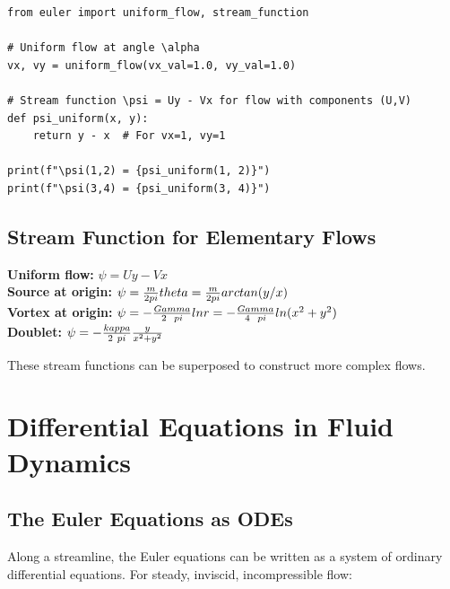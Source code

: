 \begin{lstlisting}[caption={Stream function for uniform flow}, label=lst:stream_uniform]
from euler import uniform_flow, stream_function

# Uniform flow at angle \alpha
vx, vy = uniform_flow(vx_val=1.0, vy_val=1.0)

# Stream function \psi = Uy - Vx for flow with components (U,V)
def psi_uniform(x, y):
    return y - x  # For vx=1, vy=1

print(f"\psi(1,2) = {psi_uniform(1, 2)}")
print(f"\psi(3,4) = {psi_uniform(3, 4)}")
\end{lstlisting}

\subsection{Stream Function for Elementary Flows}

\textbf{Uniform flow:} $\psi = Uy - Vx$\\
\textbf{Source at origin:} $\psi = \frac{m}{2\\pi}\\theta = \frac{m}{2\\pi}\\arctan(y/x)$\\
\textbf{Vortex at origin:} $\psi = -\frac{\\Gamma}{2\\pi}\\ln r = -\frac{\\Gamma}{4\\pi}\\ln(x^2+y^2)$\\
\textbf{Doublet:} $\psi = -\frac{\\kappa}{2\\pi}\frac{y}{x^2+y^2}$

These stream functions can be superposed to construct more complex flows.

\section{Differential Equations in Fluid Dynamics}

\subsection{The Euler Equations as ODEs}

Along a streamline, the Euler equations can be written as a system of ordinary differential equations. For steady, inviscid, incompressible flow:

